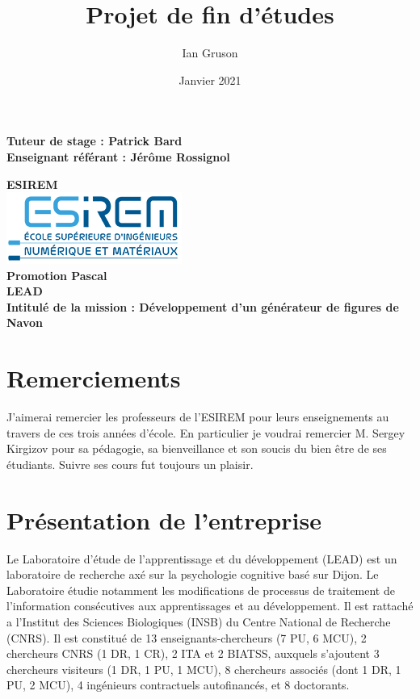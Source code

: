\documentclass{article}
\title{Projet de fin d'études}
\author{Ian Gruson}
\date{Janvier 2021}
\begin{document}
\maketitle
\begin{center}
\large\textbf{Tuteur de stage : Patrick Bard}\\
\large\textbf{Enseignant référant : Jérôme Rossignol}

\end{center}
\begin{center}
\large\textbf{ESIREM}\\
\includegraphics[scale=0.7]{images/logoEsirem}\\
\large\textbf{Promotion Pascal}
\\
\large\textbf{LEAD}\\
\large\textbf{Intitulé de la mission : Développement d'un générateur de figures de Navon}
\end{center}
\newpage
\renewcommand{\contentsname}{Sommaire}
\tableofcontents
\newpage
\renewcommand{\listfigurename}{Liste des figures}
\listoffigures
\newpage
\section{Remerciements}
J'aimerai remercier les professeurs de l'ESIREM pour leurs enseignements au travers de ces trois années d'école. En particulier je voudrai remercier M. Sergey Kirgizov pour sa pédagogie, sa bienveillance et son soucis du bien être de ses étudiants. Suivre ses cours fut toujours un plaisir.

\newpage
\section{Présentation de l'entreprise}
	Le Laboratoire d'étude de l'apprentissage et du développement (LEAD) est un laboratoire de recherche axé sur la psychologie cognitive basé sur Dijon. Le Laboratoire étudie notamment les modifications de processus de traitement de l'information consécutives aux apprentissages et au développement. Il est rattaché a l'Institut des Sciences Biologiques (INSB) du Centre National de Recherche (CNRS). Il est constitué de 13 enseignants-chercheurs (7 PU, 6 MCU), 2 chercheurs CNRS (1 DR, 1 CR), 2 ITA et 2 BIATSS, auxquels s’ajoutent 3 chercheurs visiteurs (1 DR, 1 PU, 1 MCU), 8 chercheurs associés (dont 1 DR, 1 PU, 2 MCU), 4 ingénieurs contractuels autofinancés, et 8 doctorants. 
\end{document}
